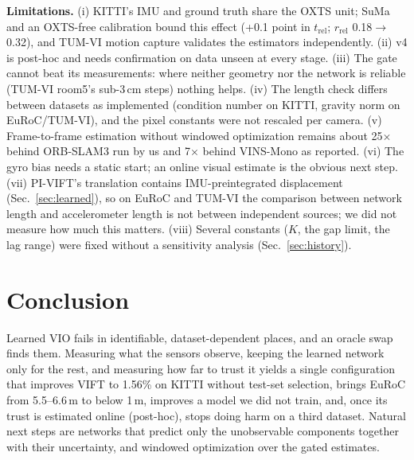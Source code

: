 \documentclass[letterpaper,journal]{IEEEtran}
\begin{document}
\textbf{Limitations.} (i) KITTI's IMU and ground truth share the OXTS unit; SuMa and an OXTS-free calibration bound this effect (+0.1 point in $t_\mathrm{rel}$; $r_\mathrm{rel}$ 0.18$\to$0.32), and TUM-VI motion capture validates the estimators independently. (ii) v4 is post-hoc and needs confirmation on data unseen at every stage. (iii) The gate cannot beat its measurements: where neither geometry nor the network is reliable (TUM-VI room5's sub-3\,cm steps) nothing helps. (iv) The length check differs between datasets as implemented (condition number on KITTI, gravity norm on EuRoC/TUM-VI), and the pixel constants were not rescaled per camera. (v) Frame-to-frame estimation without windowed optimization remains about 25$\times$ behind ORB-SLAM3 run by us and 7$\times$ behind VINS-Mono as reported. (vi) The gyro bias needs a static start; an online visual estimate is the obvious next step. (vii) PI-VIFT's translation contains IMU-preintegrated displacement (Sec.~\ref{sec:learned}), so on EuRoC and TUM-VI the comparison between network length and accelerometer length is not between independent sources; we did not measure how much this matters. (viii) Several constants ($K$, the gap limit, the lag range) were fixed without a sensitivity analysis (Sec.~\ref{sec:history}).

\section{Conclusion}

Learned VIO fails in identifiable, dataset-dependent places, and an oracle swap finds them. Measuring what the sensors observe, keeping the learned network only for the rest, and measuring how far to trust it yields a single configuration that improves VIFT to 1.56\% on KITTI without test-set selection, brings EuRoC from 5.5--6.6\,m to below 1\,m, improves a model we did not train, and, once its trust is estimated online (post-hoc), stops doing harm on a third dataset. Natural next steps are networks that predict only the unobservable components together with their uncertainty, and windowed optimization over the gated estimates.



\end{document}
